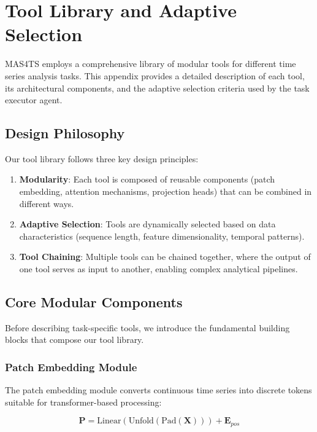 \section{Tool Library and Adaptive Selection}
\label{appx:tool_library}

MAS4TS employs a comprehensive library of modular tools for different time series analysis tasks. This appendix provides a detailed description of each tool, its architectural components, and the adaptive selection criteria used by the task executor agent.

\subsection{Design Philosophy}
\label{appx:tool_philosophy}

Our tool library follows three key design principles:

\begin{enumerate}[leftmargin=*, itemsep=2pt]
    \item \textbf{Modularity}: Each tool is composed of reusable components (patch embedding, attention mechanisms, projection heads) that can be combined in different ways.
    \item \textbf{Adaptive Selection}: Tools are dynamically selected based on data characteristics (sequence length, feature dimensionality, temporal patterns).
    \item \textbf{Tool Chaining}: Multiple tools can be chained together, where the output of one tool serves as input to another, enabling complex analytical pipelines.
\end{enumerate}

\subsection{Core Modular Components}
\label{appx:core_components}

Before describing task-specific tools, we introduce the fundamental building blocks that compose our tool library.

\subsubsection{Patch Embedding Module}
\label{appx:patch_embedding}

The patch embedding module converts continuous time series into discrete tokens suitable for transformer-based processing:

\begin{equation}
    \mathbf{P} = \text{Linear}(\text{Unfold}(\text{Pad}(\mathbf{X}))) + \mathbf{E}_{pos}
\end{equation}

